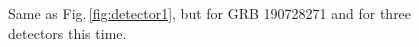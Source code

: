 \documentclass[binding=0.6cm, LaM]{sapthesis}
\begin{document}
        \begin{figure}[!t]
          \noindent
          \label{detector2_final}
          \centering
          \caption{Same as Fig.\,\ref{fig:detector1}, but for GRB 190728271 and for three detectors this time.}
          \label{fig:detector2_final}
        \end{figure}
\end{document}
